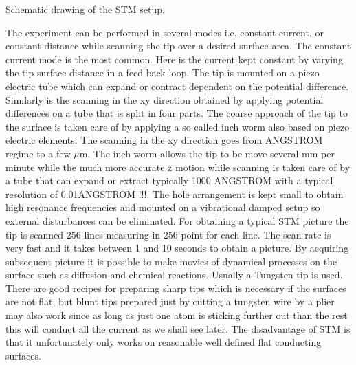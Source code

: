 \vspace*{11cm}

 Schematic drawing of the STM setup.

\vspace{1cm}


The experiment can be performed in several modes i.e. constant current, or constant distance while scanning the tip over a desired surface area. The constant current mode is the most common. Here is the current kept constant by varying the tip-surface distance in a feed back loop. The tip is mounted on a piezo electric tube which can expand or contract dependent on the potential difference. Similarly is the scanning in the xy direction obtained by applying potential differences on a tube that is split in four parts. The coarse approach of the tip to the surface is taken care of by applying a so called inch worm also based on piezo electric elements. The scanning in the xy direction goes from ANGSTROM regime to a few  $\mu$m. The inch worm allows the tip to be move several mm per minute while the much more accurate z motion while scanning is taken care of by a tube that can expand or extract typically 1000 ANGSTROM with a typical resolution of 0.01ANGSTROM !!!. The hole arrangement is kept small to obtain high resonance frequencies and  mounted on a vibrational damped setup so external disturbances can be eliminated.  For obtaining a typical STM picture the tip is scanned 256 lines measuring in 256 point for each line. The scan rate is very fast and it takes between 1 and 10 seconds to obtain a picture. By acquiring subsequent picture it is possible to make movies of dynamical processes on the surface such as diffusion and chemical reactions. Usually a Tungsten tip is used. There are good recipes for preparing sharp tips which is necessary if the surfaces are not flat, but blunt tips prepared just by cutting a tungsten wire by a plier may also work since as long as just one atom is sticking further out than the rest this will conduct all the current as we shall see later.  The disadvantage of STM is  that it unfortunately only works on reasonable well defined flat conducting surfaces.

